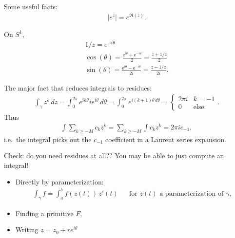 \begin{fact}

Some useful facts:
\begin{align*}
{\left\lvert {e^{z}} \right\rvert} = e^{\Re(z)}
.\end{align*}

On \(S^1\),
\begin{align*}
1/z = e^{-i\theta} \\
\cos (\theta)=\frac{\mathrm{e}^{i \theta}+\mathrm{e}^{-i \theta}}{2}=\frac{z+1 / z}{2} \\
\sin (\theta)=\frac{\mathrm{e}^{i \theta}-\mathrm{e}^{-i \theta}}{2 i}=\frac{z-1 / z}{2 i} 
.\end{align*}

\end{fact}

\begin{fact}

The major fact that reduces integrals to residues:
\begin{align*}
\int_\gamma z^k \,dz= \int_0^{2\pi} e^{ik\theta} ie^{i\theta } \,d\theta= \int_0^{2\pi} e^{i(k+1)\theta \,d\theta}
=
\begin{cases}
2\pi i & k=-1 
\\
0 & \text{else}.
\end{cases}
.\end{align*}
Thus
\begin{align*}
\int \sum_{k\geq -M} c_k z^k = \sum_{k\geq -M} \int c_k z^k = 2\pi i c_{-1}
,\end{align*}
i.e.~the integral picks out the \(c_{-1}\) coefficient in a Laurent
series expansion.

\end{fact}

\begin{remark}

Check: do you need residues at all?? You may be able to just compute an
integral!

\begin{itemize}
\item
  Directly by parameterization:
  \begin{align*}
  \int_\gamma f = \int_a^b f(z(t))\, z'(t) && \text{for } z(t) \text{ a parameterization of } \gamma
  ,\end{align*}
\item
  Finding a primitive \(F\),
\item
  Writing \(z= z_0 + re^{i \theta }\)
\end{itemize}

\end{remark}

